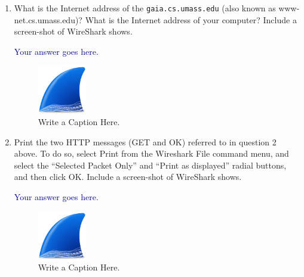 \documentclass{article}
\begin{document}
\begin{enumerate}[1.]
  \item What is the Internet address of the \texttt{gaia.cs.umass.edu} (also known as
    www-net.cs.umass.edu)? What is the Internet address of your computer?  Include a screen-shot of
  WireShark shows. \smallskip

    \textcolor{darkblue}{%
      Your answer goes here.
      }
    
      \medskip 
      
\begin{figure}[h]
  \centering
  \includegraphics[width=0.2\textwidth]{./shark.png} 
  \caption{Write a Caption Here.}
  \label{fig:answer:3}
\end{figure}

      
\item Print the two HTTP messages (GET and OK) referred to in question 2 above. To do
      so, select Print from the Wireshark File command menu, and select the “Selected
      Packet Only” and “Print as displayed” radial buttons, and then click OK. Include a screen-shot of
  WireShark shows. \smallskip

    \textcolor{darkblue}{%
      Your answer goes here.
      }
      \medskip 
      
\begin{figure}[h]
  \centering
  \includegraphics[width=0.2\textwidth]{./shark.png} 
  \caption{Write a Caption Here.}
  \label{fig:answer:4}
\end{figure}
      
\end{enumerate}
\end{document}

